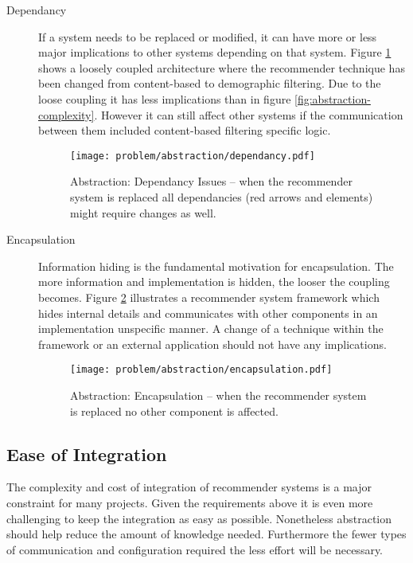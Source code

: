 \begin{description}
    \item[Dependancy] If a system needs to be replaced or modified, it can have more or less major implications to other systems depending on that system. Figure \ref{fig:abstraction-dependancy} shows a loosely coupled architecture where the recommender technique has been changed from content-based to demographic filtering. Due to the loose coupling it has less implications than in figure \ref{fig:abstraction-complexity}. However it can still affect other systems if the communication between them included content-based filtering specific logic.

    \begin{figure}[H]
        \texttt{[image: problem/abstraction/dependancy.pdf]}
        \caption[Abstraction: Dependancy Issues]{Abstraction: Dependancy Issues -- when the recommender system is replaced all dependancies (red arrows and elements) might require changes as well.}
        \label{fig:abstraction-dependancy}
    \end{figure}

    \item[Encapsulation] Information hiding is the fundamental motivation for encapsulation. The more information and implementation is hidden, the looser the coupling becomes. Figure \ref{fig:abstraction-encapsulation} illustrates a recommender system framework which hides internal details and communicates with other components in an implementation unspecific manner. A change of a technique within the framework or an external application should not have any implications.

    \begin{figure}[H]
        \texttt{[image: problem/abstraction/encapsulation.pdf]}
        \caption[Abstraction: Encapsulation]{Abstraction: Encapsulation -- when the recommender system is replaced no other component is affected.}
        \label{fig:abstraction-encapsulation}
    \end{figure}
\end{description}

\subsection{Ease of Integration}

The complexity and cost of integration of recommender systems is a major constraint for many projects. Given the requirements above it is even more challenging to keep the integration as easy as possible. Nonetheless abstraction should help reduce the amount of knowledge needed. Furthermore the fewer types of communication and configuration required the less effort will be necessary.